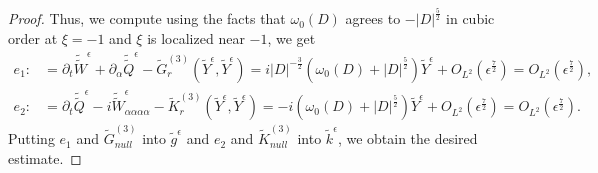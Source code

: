 \documentclass[10pt,a4paper]{amsart}
\newcommand{\al}{\alpha}
\newcommand{\e}{\epsilon}
\newcommand{\f}{\frac}
\begin{document}
\begin{proof}
Thus, we compute using the facts that $\omega_0(D)$ agrees to $-|D|^{\f52}$ in cubic order at $\xi = -1$ and $\xi$ is localized near $-1$, we get
\begin{align*}
e_1 :&= \partial_t \tilde{\tilde{W}}^\e+ \partial_\al\tilde{\tilde{Q}}^\e - \tilde{G}_{r}^{(3)} (\tilde{Y}^\e, \tilde{Y}^\e) = i|D|^{-\f32}(\omega_0 (D) +|D|^{\frac{5}{2}}) \tilde{Y}^\e + O_{L^2} (\epsilon^{\frac{7}{2}}) = O_{L^2} (\epsilon^{\frac{7}{2}}), \\
e_2 :&= \partial_t \tilde{\tilde{Q}}^\e-i \tilde{\tilde{W}}^\e_{\al \al \al \al} - \tilde{K}_{r}^{(3)} (\tilde{Y}^\e, \tilde{Y}^\e) = -i (\omega_0 (D) +|D|^{\frac{5}{2}}) \tilde{Y}^\e + O_{L^2} (\epsilon^{\frac{7}{2}}) = O_{L^2} (\epsilon^{\frac{7}{2}}).
\end{align*}
Putting $e_1$ and $\tilde{G}^{(3)}_{null}$ into $\tilde{g}^\epsilon$ and $e_2$ and $\tilde{K}^{(3)}_{null}$ into $\tilde{k}^\epsilon$, we obtain the desired estimate.
\end{proof}
\end{document}
